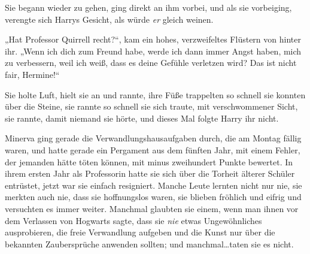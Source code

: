 Sie begann wieder zu gehen, ging direkt an ihm vorbei, und als sie vorbeiging, verengte sich Harrys Gesicht, als würde \emph{er} gleich weinen.

„Hat Professor Quirrell recht?“, kam ein hohes, verzweifeltes Flüstern von hinter ihr. „Wenn ich dich zum Freund habe, werde ich dann immer Angst haben, mich zu verbessern, weil ich weiß, dass es deine Gefühle verletzen wird? Das ist nicht fair, Hermine!“

Sie holte Luft, hielt sie an und rannte, ihre Füße trappelten so schnell sie konnten über die Steine, sie rannte so schnell sie sich traute, mit verschwommener Sicht, sie rannte, damit niemand sie hörte, und dieses Mal folgte Harry ihr nicht.

\later

Minerva ging gerade die Verwandlungshausaufgaben durch, die am Montag fällig waren, und hatte gerade ein Pergament aus dem fünften Jahr, mit einem Fehler, der jemanden hätte töten können, mit minus zweihundert Punkte bewertet. In ihrem ersten Jahr als Professorin hatte sie sich über die Torheit älterer Schüler entrüstet, jetzt war sie einfach resigniert. Manche Leute lernten nicht nur nie, sie merkten auch nie, dass sie hoffnungslos waren, sie blieben fröhlich und eifrig und versuchten es immer weiter. Manchmal glaubten sie einem, wenn man ihnen vor dem Verlassen von Hogwarts sagte, dass sie \emph{nie} etwas Ungewöhnliches ausprobieren, die freie Verwandlung aufgeben und die Kunst nur über die bekannten Zaubersprüche anwenden sollten; und manchmal…taten sie es nicht.

